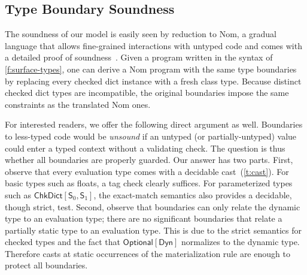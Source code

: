 \documentclass[english,cleveref,submission]{programming}
\newcommand{\code}[1]{\texttt{#1}}
\newcommand{\spapp}[2]{#1\,(#2)}
\newcommand{\spann}[2]{#1\!:\!#2}
\newcommand{\typefont}[1]{\mathsf{#1}}
\newcommand{\codefont}[1]{\emph{#1}}
\newcommand{\paramtype}[2]{#1[#2]}
\newcommand{\spteval}{\typefont{S}}
\newcommand{\sptclass}{\typefont{C}}
\newcommand{\sptdyn}{\typefont{Dyn}}
\newcommand{\sptoptional}[1]{\paramtype{\typefont{Optional}}{#1}}
\newcommand{\sptchkdict}[2]{\paramtype{\typefont{ChkDict}}{#1, #2}}
\newcommand{\sptenv}{\typefont{Env}}
\newcommand{\sptvardef}[2]{\spann{#1}{#2}}
\newcommand{\spx}{\code{x}}
\newcommand{\spf}{\code{f}}
\newcommand{\spc}{\sptclass}
\newcommand{\spexpr}{\codefont{expr}}
\newcommand{\vdashsub}[1]{\vdash_{#1}}
\newcommand{\wtprog}{\vdashsub{\mathbf{P}}}
\newcommand{\wtexpr}{\vdashsub{\mathbf{E}}}
\newcommand{\spvardef}[3]{\sptvardef{#1}{#2} = #3}
\newcommand{\spfundef}[4]{\mathrm{def}~\spapp{#1}{#2}\code{ -> }#3: #4}
\newcommand{\spclassdef}[4]{\mathrm{class}~\spapp{#1}{#2}:~#3;~#4}
\newcommand{\spself}{\code{self}}
\begin{document}
%


\subsection{Type Boundary Soundness}
\label{s:ts}

The soundness of our model is easily seen by reduction to Nom, a gradual
language that allows fine-grained interactions with untyped code and comes with
a detailed proof of soundness~\cite{mt-oopsla-2017,mt-oopsla-2021}.
Given a program written in the syntax of \cref{f:surface-types}, one can derive
a Nom program with the same type boundaries by replacing every checked
dict instance with a fresh class type.
Because distinct checked dict types are incompatible, the
original boundaries impose the same constraints as the translated Nom ones.

For interested readers, we offer the following direct argument as well.
Boundaries to less-typed code would be \emph{unsound} if an untyped
(or partially-untyped) value could enter a typed context without
a validating check.
The question is thus whether all boundaries are properly guarded.
Our answer has two parts.
First, observe that every evaluation type comes with a decidable
cast~(\cref{t:cast}).
For basic types such as floats, a tag check clearly suffices.
For parameterized types such as $\sptchkdict{\spteval_0}{\spteval_1}$,
the exact-match semantics also provides a decidable, though strict, test.
Second, observe that boundaries can only relate the dynamic type to an
evaluation type; there are no significant boundaries that relate a partially
static type to an evaluation type.
This is due to the strict semantics for checked types and the fact that
$\sptoptional{\sptdyn}$ normalizes to the dynamic type.
Therefore casts at static occurrences of the materialization rule are
enough to protect all boundaries.
\end{document}
